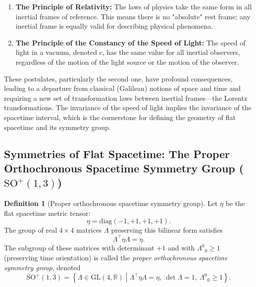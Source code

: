 \documentclass{amsart}
\theoremstyle{definition}
\newtheorem{definition}{Definition}[theorem]
\theoremstyle{remark}
\begin{document}
\begin{enumerate}
    \item \textbf{The Principle of Relativity:} The laws of physics take the same form in all inertial frames of reference. This means there is no "absolute" rest frame; any inertial frame is equally valid for describing physical phenomena.
    \item \textbf{The Principle of the Constancy of the Speed of Light:} The speed of light in a vacuum, denoted $c$, has the same value for all inertial observers, regardless of the motion of the light source or the motion of the observer.
\end{enumerate}
These postulates, particularly the second one, have profound consequences, leading to a departure from classical (Galilean) notions of space and time and requiring a new set of transformation laws between inertial frames—the Lorentz transformations. The invariance of the speed of light implies the invariance of the spacetime interval, which is the cornerstone for defining the geometry of flat spacetime and its symmetry group.

\subsection{Symmetries of Flat Spacetime: The Proper Orthochronous Spacetime Symmetry Group ($\mathrm{SO}^+(1,3)$)}
\label{subsec:so13_group}
\begin{definition}[Proper orthochronous spacetime symmetry group]
  Let $\eta$ be the flat spacetime metric tensor:
  \begin{equation*}
    \eta = \mathrm{diag}(-1, +1, +1, +1).
  \end{equation*}
  The group of real $4 \times 4$ matrices $\Lambda$ preserving this bilinear form satisfies
  \begin{equation*}
    \Lambda^\top \eta \Lambda = \eta.
  \end{equation*}
  The subgroup of these matrices with determinant $+1$ and with $\Lambda^0{}_0 \geq 1$ (preserving time orientation) is called the \emph{proper orthochronous spacetime symmetry group}, denoted
  \begin{equation*}
    \mathrm{SO}^+(1,3) = \left\{ \Lambda \in \mathrm{GL}(4,\mathbb{R}) \middle|
    \Lambda^\top \eta \Lambda = \eta,\ \det \Lambda = 1,\ \Lambda^0{}_0 \geq 1 \right\}.
  \end{equation*}
\end{definition}
\end{document}
